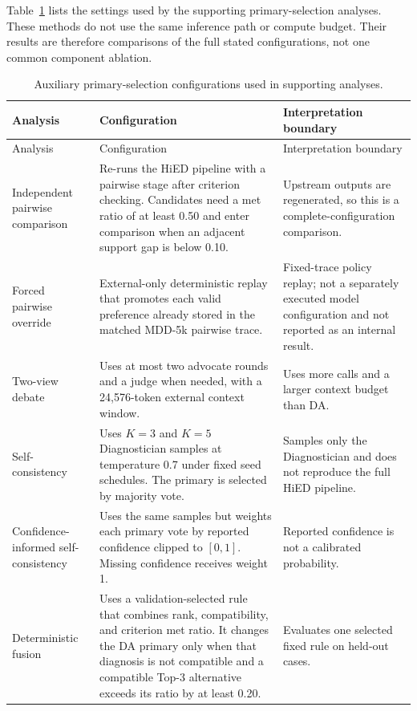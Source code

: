 \documentclass[12pt,a4paper,oneside]{report}
\begin{document}
Table~\ref{tab:additional-inference-configs} lists the settings used by the supporting primary-selection analyses. These methods do not use the same inference path or compute budget. Their results are therefore comparisons of the full stated configurations, not one common component ablation.

\begingroup
\small
\begin{longtable}{|>{\raggedright\arraybackslash}p{3.2cm}|>{\raggedright\arraybackslash}p{6.0cm}|>{\raggedright\arraybackslash}p{5.0cm}|}
\caption{Auxiliary primary-selection configurations used in supporting analyses.}
\label{tab:additional-inference-configs}\\
\hline
Analysis & Configuration & Interpretation boundary\\
\hline
\endfirsthead
\hline
Analysis & Configuration & Interpretation boundary\\
\hline
\endhead
Independent pairwise comparison & Re-runs the HiED pipeline with a pairwise stage after criterion checking. Candidates need a met ratio of at least 0.50 and enter comparison when an adjacent support gap is below 0.10. & Upstream outputs are regenerated, so this is a complete-configuration comparison.\\
\hline
Forced pairwise override & External-only deterministic replay that promotes each valid preference already stored in the matched MDD-5k pairwise trace. & Fixed-trace policy replay; not a separately executed model configuration and not reported as an internal result.\\
\hline
Two-view debate & Uses at most two advocate rounds and a judge when needed, with a 24,576-token external context window. & Uses more calls and a larger context budget than DA.\\
\hline
Self-consistency & Uses $K=3$ and $K=5$ Diagnostician samples at temperature 0.7 under fixed seed schedules. The primary is selected by majority vote. & Samples only the Diagnostician and does not reproduce the full HiED pipeline.\\
\hline
Confidence-informed self-consistency & Uses the same samples but weights each primary vote by reported confidence clipped to $[0,1]$. Missing confidence receives weight 1. & Reported confidence is not a calibrated probability.\\
\hline
Deterministic fusion & Uses a validation-selected rule that combines rank, compatibility, and criterion met ratio. It changes the DA primary only when that diagnosis is not compatible and a compatible Top-3 alternative exceeds its ratio by at least 0.20. & Evaluates one selected fixed rule on held-out cases.\\
\hline
\end{longtable}
\endgroup
\end{document}
